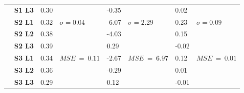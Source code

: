 \begin{table}[htbp]
\begin{tabular}{@{}llllllll@{}}
           & \textbf{S1 L3} & 0.30 &                       & -0.35 &                        & 0.02  &                       \\
           & \textbf{S2 L1} & 0.32 & \multirow{3}{*}{$\sigma = 0.04$} & -6.07 & \multirow{3}{*}{$\sigma = 2.29$}  & 0.23  & \multirow{3}{*}{$\sigma = 0.09$} \\
           & \textbf{S2 L2} & 0.38 &                       & -4.03 &                        & 0.15  &                       \\
           & \textbf{S2 L3} & 0.39 &                       & 0.29  &                        & -0.02 &                       \\
           & \textbf{S3 L1} & 0.34 & \multirow{3}{*}{$\scriptstyle{MSE}~=~0.11$} & -2.67 & \multirow{3}{*}{$\scriptstyle{MSE}~=~6.97$}  & 0.12  & \multirow{3}{*}{$\scriptstyle{MSE}~=~0.01$} \\
           & \textbf{S3 L2} & 0.36 &                       & -0.29 &                        & 0.01  &                       \\
           & \textbf{S3 L3} & 0.29 &                       & 0.12  &                        & -0.01 &                       \\ \cmidrule(r){1-8}
    \end{tabular}
\end{table}
